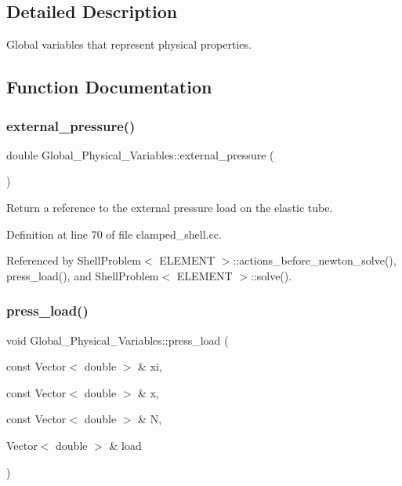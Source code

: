 \subsection{Detailed Description}
Global variables that represent physical properties. 

\subsection{Function Documentation}
\mbox{\label{namespaceGlobal__Physical__Variables_a80149b39ce76ea0a779f7493905eb1b8}} 
\subsubsection{\texorpdfstring{external\+\_\+pressure()}{external\_pressure()}}
{\footnotesize\ttfamily double Global\+\_\+\+Physical\+\_\+\+Variables\+::external\+\_\+pressure (\begin{DoxyParamCaption}{ }\end{DoxyParamCaption})}



Return a reference to the external pressure load on the elastic tube. 



Definition at line 70 of file clamped\+\_\+shell.\+cc.



Referenced by Shell\+Problem$<$ E\+L\+E\+M\+E\+N\+T $>$\+::actions\+\_\+before\+\_\+newton\+\_\+solve(), press\+\_\+load(), and Shell\+Problem$<$ E\+L\+E\+M\+E\+N\+T $>$\+::solve().

\mbox{\label{namespaceGlobal__Physical__Variables_a86fd8f502cb8c4c7939ffae742f023eb}} 
\subsubsection{\texorpdfstring{press\+\_\+load()}{press\_load()}}
{\footnotesize\ttfamily void Global\+\_\+\+Physical\+\_\+\+Variables\+::press\+\_\+load (\begin{DoxyParamCaption}\item[{const Vector$<$ double $>$ \&}]{xi,  }\item[{const Vector$<$ double $>$ \&}]{x,  }\item[{const Vector$<$ double $>$ \&}]{N,  }\item[{Vector$<$ double $>$ \&}]{load }\end{DoxyParamCaption})}



